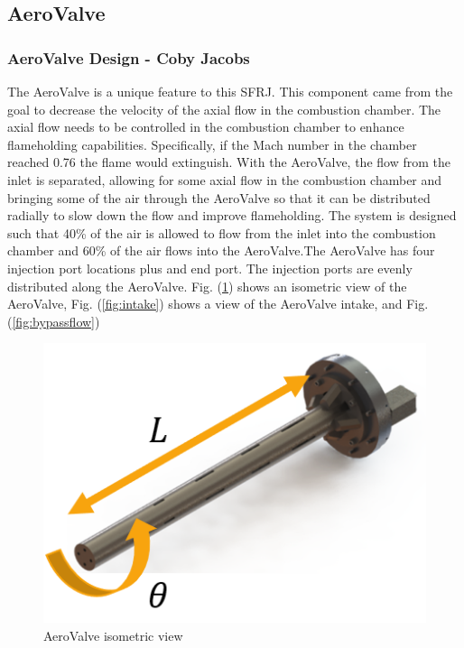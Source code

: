 \subsection{AeroValve}
\subsubsection{AeroValve Design - Coby Jacobs}
\label{AeroValveDesign}
The AeroValve is a unique feature to this SFRJ. This component came from the goal to decrease the velocity of the axial flow in the combustion chamber. The axial flow needs to be controlled in the combustion chamber to enhance flameholding capabilities. Specifically, if the Mach number in the chamber reached 0.76 the flame would extinguish. With the AeroValve, the flow from the inlet is separated, allowing for some axial flow in the combustion chamber and bringing some of the air through the AeroValve so that it can be distributed radially to slow down the flow and improve flameholding. The system is designed such that 40\% of the air is allowed to flow from the inlet into the combustion chamber and 60\% of the air flows into the AeroValve.The AeroValve has four injection port locations plus and end port. The injection ports are evenly distributed along the AeroValve. Fig. (\ref{fig:isometric}) shows an isometric view of the AeroValve, Fig. (\ref{fig:intake}) shows a view of the AeroValve intake, and Fig. (\ref{fig:bypassflow})

\begin{figure}[H]
    \centering
    \includegraphics[width=0.7\linewidth]{Combustor_Figures/isometric.png}
    \caption{AeroValve isometric view}
    \label{fig:isometric}
\end{figure}

